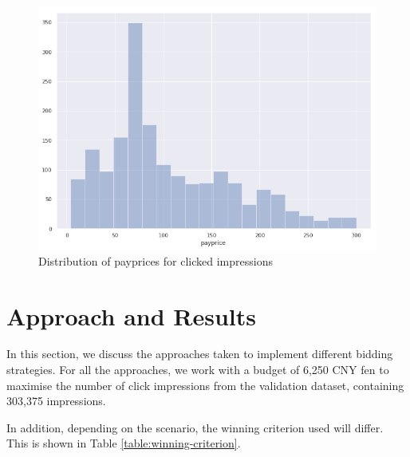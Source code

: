 \documentclass{sig-alternate-05-2015}
\begin{document}
\begin{figure}[h!]
	\centering
	\includegraphics[width=\linewidth]{images/payprice_click_dist.png}
	\caption{Distribution of payprices for clicked impressions}
	\label{fig:click-payprice-dist}
\end{figure}


\section{Approach and Results}
In this section, we discuss the approaches taken to implement different bidding strategies. For all the approaches, we work with a budget of 6,250 CNY fen to maximise the number of click impressions from the validation dataset, containing 303,375 impressions.

In addition, depending on the scenario, the winning criterion used will differ. This is shown in Table \ref{table:winning-criterion}. 

\begin{table}[h!]
  \centering
	\caption{Overview of Winning Criterion}
	\label{table:winning-criterion}
\end{table}
\end{document}
